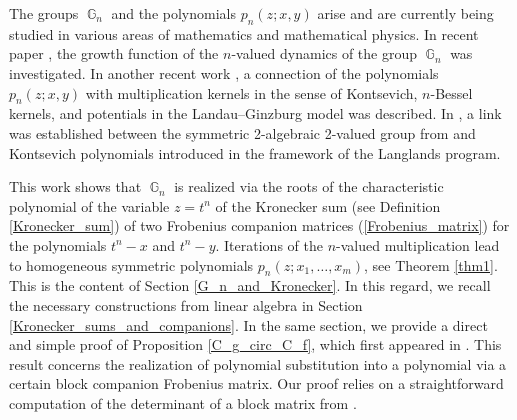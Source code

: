 \documentclass[14pt, dvipsnames]{extarticle}
\theoremstyle{definition}
\theoremstyle{definition}
\theoremstyle{remark}
\DeclareMathOperator{\G}{\mathbb{G}}
\begin{document}
The groups $\G_n$ and the polynomials $p_n(z; x, y)$ arise and are currently being studied in various areas of mathematics and mathematical physics. In recent paper \cite{Chirkov}, the growth function of the $n$-valued dynamics of the group $\G_n$ was investigated. In another recent work \cite{Gaiur}, a connection of the polynomials $p_n(z; x, y)$ with multiplication kernels in the sense of Kontsevich, $n$-Bessel kernels, and potentials in the Landau–Ginzburg model was described. In \cite{Gaiur}, a link was established between the symmetric 2-algebraic 2-valued group from \cite{Buchstaber90} and Kontsevich polynomials introduced in the framework of the Langlands program.

This work shows that $\G_n$ is realized via the roots of the characteristic polynomial of the variable $z = t^n$ of the Kronecker sum (see Definition \ref{Kronecker_sum}) of two Frobenius companion matrices (\ref{Frobenius_matrix}) for the polynomials $t^n-x$ and $t^n-y$. Iterations of the $n$-valued multiplication lead to homogeneous symmetric polynomials $p_n(z; x_1, \dots, x_m)$, see Theorem \ref{thm1}. This is the content of Section \ref{G_n_and_Kronecker}. In this regard, we recall the necessary constructions from linear algebra in Section \ref{Kronecker_sums_and_companions}. In the same section, we provide a direct and simple proof of Proposition \ref{C_g_circ_C_f}, which first appeared in \cite[Theorem 1]{Carrillo}. This result concerns the realization of polynomial substitution into a polynomial via a certain block companion Frobenius matrix. Our proof relies on a straightforward computation of the determinant of a block matrix from \cite[Lemma 2.1]{Melman}.
\end{document}
